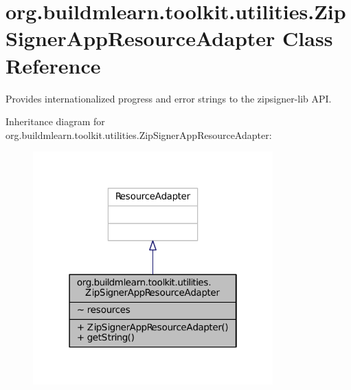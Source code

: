 \hypertarget{classorg_1_1buildmlearn_1_1toolkit_1_1utilities_1_1ZipSignerAppResourceAdapter}{\section{org.\-buildmlearn.\-toolkit.\-utilities.\-Zip\-Signer\-App\-Resource\-Adapter Class Reference}
\label{classorg_1_1buildmlearn_1_1toolkit_1_1utilities_1_1ZipSignerAppResourceAdapter}
}


Provides internationalized progress and error strings to the zipsigner-\/lib A\-P\-I.  




Inheritance diagram for org.\-buildmlearn.\-toolkit.\-utilities.\-Zip\-Signer\-App\-Resource\-Adapter\-:
\nopagebreak
\begin{figure}[H]
\begin{center}
\leavevmode
\includegraphics[width=262pt]{d0/dc1/classorg_1_1buildmlearn_1_1toolkit_1_1utilities_1_1ZipSignerAppResourceAdapter__inherit__graph}
\end{center}
\end{figure}


